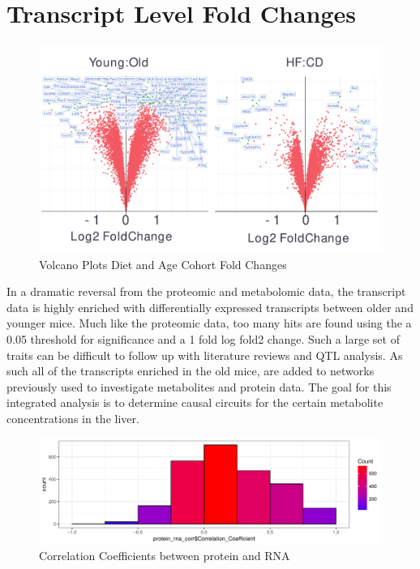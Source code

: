 \documentclass[a4paper,11pt,twoside]{book}
\begin{document}
	\section{Transcript Level Fold Changes}
	
	\begin{figure}[ht!]
		\centering
		\includegraphics[width=1.2\linewidth]{3.Trancriptomics/VolcanoTranscrpt}
		\caption{Volcano Plots Diet and Age Cohort Fold Changes}
		\label{volcano plot: Diet and Age related Transcript Foldchanges }
	\end{figure}
	
    In a dramatic reversal from the proteomic and metabolomic data, the transcript data is highly enriched with differentially expressed transcripts between older and younger mice. Much like the proteomic data, too many hits are found using the a 0.05 threshold for significance and a 1 fold log fold2 change. Such a large set of traits can be difficult to follow up with literature reviews and QTL analysis. As such all of the transcripts enriched in the old mice, are added to networks previously used to investigate metabolites and protein data. The goal for this integrated analysis is to determine causal circuits for the certain metabolite concentrations in the liver.
	
	\begin{figure}[htb!]
		\centering
		\includegraphics[width=\linewidth]{3.Trancriptomics/Protein_RNA_COrr}
		\caption{Correlation Coefficients between protein and RNA}
		\label{fig:proteinrnacorr}
	\end{figure}
	
\end{document}
